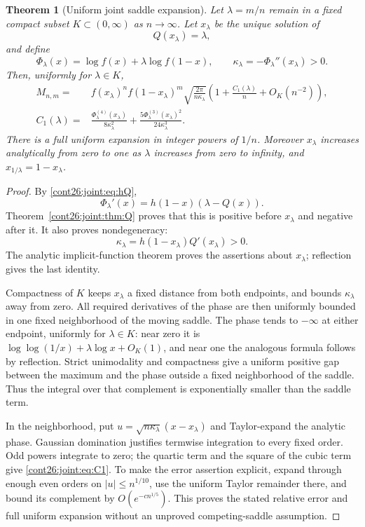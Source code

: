 \documentclass[11pt,letterpaper]{article}
\numberwithin{equation}{section}
\theoremstyle{plain}
\newtheorem{theorem}{Theorem}[section]
\theoremstyle{definition}
\theoremstyle{remark}
\begin{document}
\begin{theorem}[Uniform joint saddle expansion]
\label{cont26:joint:thm:laplace}
Let $\lambda=m/n$ remain in a fixed compact subset $K\subset(0,\infty)$
as $n\to\infty$.  Let $x_\lambda$ be the unique solution of
\begin{equation}\label{cont26:joint:eq:saddle}
 Q(x_\lambda)=\lambda,
\end{equation}
and define
\[
 \Phi_\lambda(x)=\log f(x)+\lambda\log f(1-x),\qquad
 \kappa_\lambda=-\Phi_\lambda''(x_\lambda)>0.
\]
Then, uniformly for $\lambda\in K$,
\begin{align}\label{cont26:joint:eq:laplace}
 M_{n,m}={}&f(x_\lambda)^n f(1-x_\lambda)^m
 \sqrt{\frac{2\pi}{n\kappa_\lambda}}
 \left(1+\frac{C_1(\lambda)}n+O_K(n^{-2})\right),\\
 C_1(\lambda)={}&
 \frac{\Phi_\lambda^{(4)}(x_\lambda)}{8\kappa_\lambda^2}
 +\frac{5\Phi_\lambda^{(3)}(x_\lambda)^2}{24\kappa_\lambda^3}.
 \label{cont26:joint:eq:C1}
\end{align}
There is a full uniform expansion in integer powers of $1/n$.
Moreover $x_\lambda$ increases analytically from zero to one as
$\lambda$ increases from zero to infinity, and
$x_{1/\lambda}=1-x_\lambda$.
\end{theorem}

\begin{proof}
By \eqref{cont26:joint:eq:hQ},
\[
 \Phi_\lambda'(x)=h(1-x)(\lambda-Q(x)).
\]
Theorem~\ref{cont26:joint:thm:Q} proves that this is positive before
$x_\lambda$ and negative after it.  It also proves nondegeneracy:
\begin{equation}\label{cont26:joint:eq:curvature}
 \kappa_\lambda=h(1-x_\lambda)Q'(x_\lambda)>0.
\end{equation}
The analytic implicit-function theorem proves the assertions about
$x_\lambda$; reflection gives the last identity.

Compactness of $K$ keeps $x_\lambda$ a fixed distance from both
endpoints, and bounds $\kappa_\lambda$ away from zero.  All required
derivatives of the phase are then uniformly bounded in one fixed
neighborhood of the moving saddle.  The phase tends to $-\infty$
at either endpoint, uniformly for $\lambda\in K$: near zero it is
$\log\log(1/x)+\lambda\log x+O_K(1)$, and near one the analogous
formula follows by reflection.  Strict unimodality and compactness
give a uniform positive gap between the maximum and the phase
outside a fixed neighborhood of the saddle.  Thus the integral over
that complement is exponentially smaller than the saddle term.

In the neighborhood, put $u=\sqrt{n\kappa_\lambda}(x-x_\lambda)$
and Taylor-expand the analytic phase.  Gaussian domination justifies
termwise integration to every fixed order.  Odd powers integrate to
zero; the quartic term and the square of the cubic term give
\eqref{cont26:joint:eq:C1}.  To make the error assertion explicit, expand
through enough even orders on $|u|\le n^{1/10}$, use the uniform
Taylor remainder there, and bound its complement by
$O(e^{-c n^{1/5}})$.  This proves the stated relative error and full
uniform expansion without an unproved competing-saddle assumption.
\end{proof}
\end{document}

